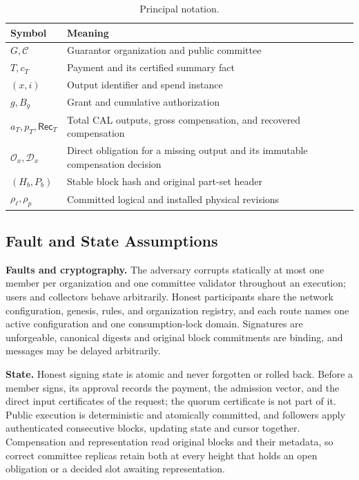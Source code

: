 \begin{table}[!b]
\caption{Principal notation.}
\label{tab:model-notation}
\centering
\begin{tabular}{@{}p{}p{}@{}}
\toprule
Symbol & Meaning \\
\midrule
$G,\mathcal C$ & Guarantor organization and public committee \\
$T,c_T$ & Payment and its certified summary fact \\
$(x,i)$ & Output identifier and spend instance \\
$g,B_g$ & Grant and cumulative authorization \\
$a_T,p_T,\mathsf{Rec}_T$ & Total CAL outputs, gross compensation, and recovered compensation \\
$\mathcal O_x,\mathcal D_x$ & Direct obligation for a missing output and its immutable compensation decision \\
$(H_b,P_b)$ & Stable block hash and original part-set header \\
$\rho_\ell,\rho_p$ & Committed logical and installed physical revisions \\
\bottomrule
\end{tabular}
\end{table}

\subsection{Fault and State Assumptions}
\label{sec:model-assumptions}

\noindent\textbf{Faults and cryptography.}
The adversary corrupts statically at most one member per organization and one committee validator throughout an execution; users and collectors behave arbitrarily. Honest participants share the network configuration, genesis, rules, and organization registry, and each route names one active configuration and one consumption-lock domain. Signatures are unforgeable, canonical digests and original block commitments are binding, and messages may be delayed arbitrarily.

\noindent\textbf{State.}
Honest signing state is atomic and never forgotten or rolled back. Before a member signs, its approval records the payment, the admission vector, and the direct input certificates of the request; the quorum certificate is not part of it. Public execution is deterministic and atomically committed, and followers apply authenticated consecutive blocks, updating state and cursor together. Compensation and representation read original blocks and their metadata, so correct committee replicas retain both at every height that holds an open obligation or a decided slot awaiting representation.

